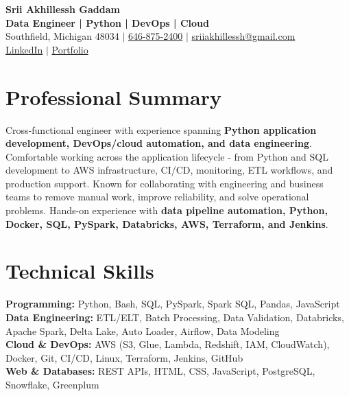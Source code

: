 \documentclass[letterpaper,10pt]{article}
\begin{document}
\fontsize{9.35pt}{10.45pt}\selectfont

\begin{center}
    {\LARGE \textbf{Srii Akhillessh Gaddam}} \\[-1pt]
    \textbf{Data Engineer | Python | DevOps | Cloud} \\[2pt]
    Southfield, Michigan 48034 $|$
    \href{tel:6468752400}{646-875-2400} $|$
    \href{mailto:sriiakhillessh@gmail.com}{sriiakhillessh@gmail.com} \\[1pt]
    \href{https://www.linkedin.com/in/srii-akhiilessh-gaddam-b48668191/}{LinkedIn} $|$
    \href{https://sriiakhillesshg.github.io/portfolio/}{Portfolio}
\end{center}
\vspace{-8pt}

\section{Professional Summary}
\small{Cross-functional engineer with experience spanning \textbf{Python application development, DevOps/cloud automation, and data engineering}. Comfortable working across the application lifecycle - from Python and SQL development to AWS infrastructure, CI/CD, monitoring, ETL workflows, and production support. Known for collaborating with engineering and business teams to remove manual work, improve reliability, and solve operational problems. Hands-on experience with \textbf{data pipeline automation, Python, Docker, SQL, PySpark, Databricks, AWS, Terraform, and Jenkins}.}

\section{Technical Skills}
\small{
\textbf{Programming:} Python, Bash, SQL, PySpark, Spark SQL, Pandas, JavaScript \\
\textbf{Data Engineering:} ETL/ELT, Batch Processing, Data Validation, Databricks, Apache Spark, Delta Lake, Auto Loader, Airflow, Data Modeling \\
\textbf{Cloud \& DevOps:} AWS (S3, Glue, Lambda, Redshift, IAM, CloudWatch), Docker, Git, CI/CD, Linux, Terraform, Jenkins, GitHub \\
\textbf{Web \& Databases:} REST APIs, HTML, CSS, JavaScript, PostgreSQL, Snowflake, Greenplum
}
\end{document}
